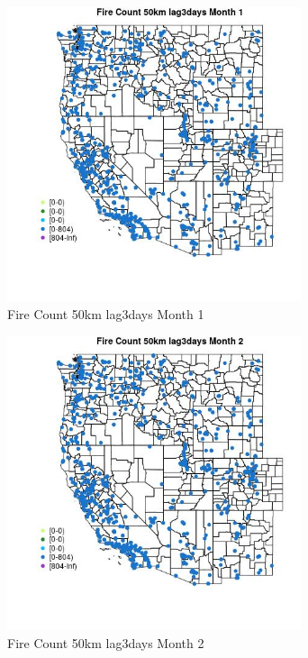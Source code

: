 \begin{figure} 
\centering  
\includegraphics[width=0.77\textwidth]{Code_Outputs/Report_ML_input_PM25_Step4_part_f_de_duplicated_aves_prioritize_24hr_obswNAs_MapObsMo1Fire_Count_50km_lag3days.jpg} 
\caption{\label{fig:Report_ML_input_PM25_Step4_part_f_de_duplicated_aves_prioritize_24hr_obswNAsMapObsMo1Fire_Count_50km_lag3days}Fire Count 50km lag3days Month 1} 
\end{figure} 
 

\clearpage 

\begin{figure} 
\centering  
\includegraphics[width=0.77\textwidth]{Code_Outputs/Report_ML_input_PM25_Step4_part_f_de_duplicated_aves_prioritize_24hr_obswNAs_MapObsMo2Fire_Count_50km_lag3days.jpg} 
\caption{\label{fig:Report_ML_input_PM25_Step4_part_f_de_duplicated_aves_prioritize_24hr_obswNAsMapObsMo2Fire_Count_50km_lag3days}Fire Count 50km lag3days Month 2} 
\end{figure} 
 

